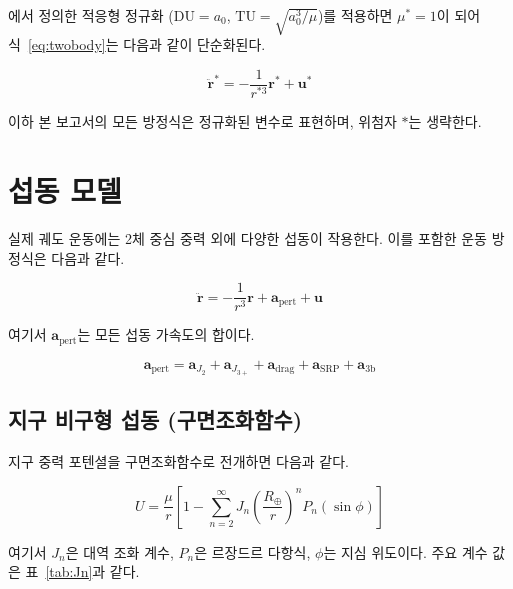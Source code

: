 \documentclass[11pt]{article}
\begin{document}
\cite{report001}에서 정의한 적응형 정규화 ($\mathrm{DU} = a_0$, $\mathrm{TU} = \sqrt{a_0^3/\mu}$)를 적용하면
$\mu^* = 1$이 되어 식~\eqref{eq:twobody}는 다음과 같이 단순화된다.

\begin{equation}
  \ddot{\mathbf{r}}^* = -\frac{1}{r^{*3}}\mathbf{r}^* + \mathbf{u}^*
  \label{eq:twobody_normalized}
\end{equation}

이하 본 보고서의 모든 방정식은 정규화된 변수로 표현하며, 위첨자 $*$는 생략한다.

\section{섭동 모델}

실제 궤도 운동에는 2체 중심 중력 외에 다양한 섭동이 작용한다.
이를 포함한 운동 방정식은 다음과 같다.

\begin{equation}
  \ddot{\mathbf{r}} = -\frac{1}{r^3}\mathbf{r} + \mathbf{a}_\mathrm{pert} + \mathbf{u}
  \label{eq:eom_full}
\end{equation}

여기서 $\mathbf{a}_\mathrm{pert}$는 모든 섭동 가속도의 합이다.

\begin{equation}
  \mathbf{a}_\mathrm{pert} = \mathbf{a}_{J_2} + \mathbf{a}_{J_{3+}} + \mathbf{a}_\mathrm{drag} + \mathbf{a}_\mathrm{SRP} + \mathbf{a}_{3\mathrm{b}}
  \label{eq:pert_total}
\end{equation}

\subsection{지구 비구형 섭동 (구면조화함수)}

지구 중력 포텐셜을 구면조화함수로 전개하면 다음과 같다.

\begin{equation}
  U = \frac{\mu}{r}\left[1 - \sum_{n=2}^{\infty} J_n \left(\frac{R_\oplus}{r}\right)^n P_n(\sin\phi)\right]
  \label{eq:gravity_potential}
\end{equation}

여기서 $J_n$은 대역 조화 계수, $P_n$은 르장드르 다항식, $\phi$는 지심 위도이다.
주요 계수 값은 표~\ref{tab:Jn}과 같다.
\end{document}
